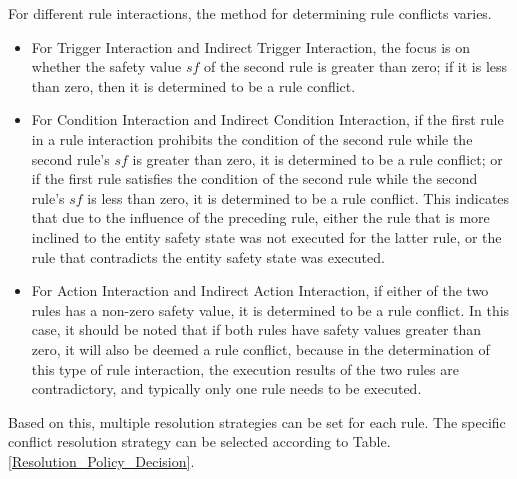 For different rule interactions, the method for determining rule conflicts varies. 
\begin{itemize}
	\item For Trigger Interaction and Indirect Trigger Interaction, the focus is on whether the safety value $sf$ of the second rule is greater than zero; if it is less than zero, then it is determined to be a rule conflict.
	\item For Condition Interaction and Indirect Condition Interaction, if the first rule in a rule interaction prohibits the condition of the second rule while the second rule’s $sf$ is greater than zero, it is determined to be a rule conflict; or if the first rule satisfies the condition of the second rule while the second rule’s $sf$ is less than zero, it is determined to be a rule conflict. This indicates that due to the influence of the preceding rule, either the rule that is more inclined to the entity safety state was not executed for the latter rule, or the rule that contradicts the entity safety state was executed.
	\item For Action Interaction and Indirect Action Interaction, if either of the two rules has a non-zero safety value, it is determined to be a rule conflict. In this case, it should be noted that if both rules have safety values greater than zero, it will also be deemed a rule conflict, because in the determination of this type of rule interaction, the execution results of the two rules are contradictory, and typically only one rule needs to be executed.
\end{itemize}

Based on this, multiple resolution strategies can be set for each rule. The specific conflict resolution strategy can be selected according to Table.\ref{Resolution_Policy_Decision}.

